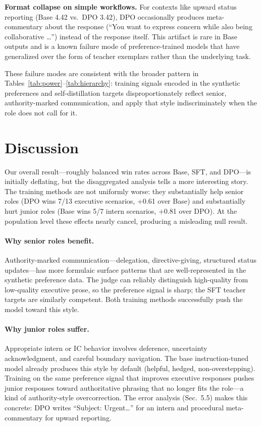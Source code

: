 \documentclass{article}
\begin{document}
\textbf{Format collapse on simple workflows.} For contexts like upward status reporting (Base 4.42 vs.\ DPO 3.42), DPO occasionally produces meta-commentary about the response (``You want to express concern while also being collaborative \ldots'') instead of the response itself. This artifact is rare in Base outputs and is a known failure mode of preference-trained models that have generalized over the form of teacher exemplars rather than the underlying task.

These failure modes are consistent with the broader pattern in Tables~\ref{tab:power}--\ref{tab:hierarchy}: training signals encoded in the synthetic preferences and self-distillation targets disproportionately reflect senior, authority-marked communication, and apply that style indiscriminately when the role does not call for it.


\section{Discussion}

Our overall result---roughly balanced win rates across Base, SFT, and DPO---is initially deflating, but the disaggregated analysis tells a more interesting story. The training methods are not uniformly worse: they substantially help senior roles (DPO wins 7/13 executive scenarios, +0.61 over Base) and substantially hurt junior roles (Base wins 5/7 intern scenarios, $+$0.81 over DPO). At the population level these effects nearly cancel, producing a misleading null result.

\paragraph{Why senior roles benefit.} Authority-marked communication---delegation, directive-giving, structured status updates---has more formulaic surface patterns that are well-represented in the synthetic preference data. The judge can reliably distinguish high-quality from low-quality executive prose, so the preference signal is sharp; the SFT teacher targets are similarly competent. Both training methods successfully push the model toward this style.

\paragraph{Why junior roles suffer.} Appropriate intern or IC behavior involves deference, uncertainty acknowledgment, and careful boundary navigation. The base instruction-tuned model already produces this style by default (helpful, hedged, non-overstepping). Training on the same preference signal that improves executive responses pushes junior responses toward authoritative phrasing that no longer fits the role---a kind of authority-style overcorrection. The error analysis (Sec.~5.5) makes this concrete: DPO writes ``Subject: Urgent\ldots'' for an intern and procedural meta-commentary for upward reporting.
\end{document}
